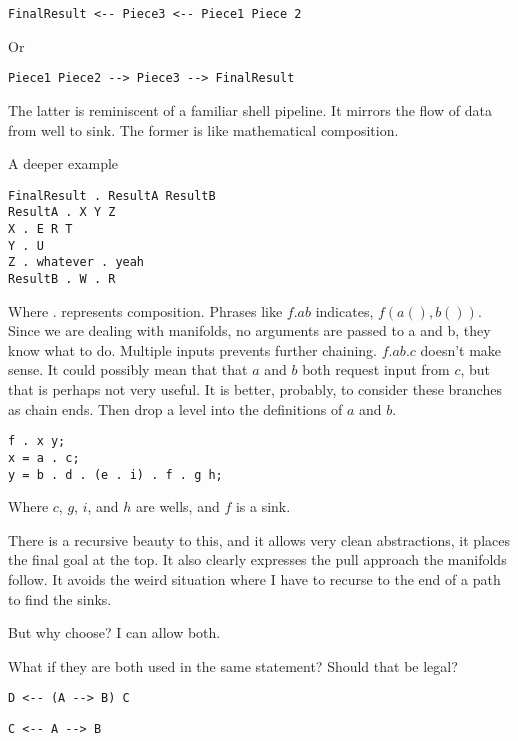 \documentclass[12pt]{article}
\begin{document}
\begin{verbatim}
FinalResult <-- Piece3 <-- Piece1 Piece 2
\end{verbatim}

Or

\begin{verbatim}
Piece1 Piece2 --> Piece3 --> FinalResult
\end{verbatim}

The latter is reminiscent of a familiar shell pipeline. It mirrors the flow of
data from well to sink. The former is like mathematical composition.

A deeper example

\begin{verbatim}
FinalResult . ResultA ResultB
ResultA . X Y Z
X . E R T
Y . U
Z . whatever . yeah
ResultB . W . R
\end{verbatim}

Where $.$ represents composition. Phrases like $f . a b$ indicates,
$f(a(),b())$. Since we are dealing with manifolds, no arguments are passed to
a and b, they know what to do. Multiple inputs prevents further chaining. $f . a b . c$ doesn't make sense. It could possibly mean that that $a$ and $b$
both request input from $c$, but that is perhaps not very useful. It is better,
probably, to consider these branches as chain ends. Then drop a level into the
definitions of $a$ and $b$.

\begin{verbatim}
f . x y;
x = a . c;
y = b . d . (e . i) . f . g h;
\end{verbatim}

Where $c$, $g$, $i$, and $h$ are wells, and $f$ is a sink.

There is a recursive beauty to this, and it allows very clean abstractions, it
places the final goal at the top. It also clearly expresses the pull approach
the manifolds follow. It avoids the weird situation where I have to recurse to
the end of a path to find the sinks.

But why choose? I can allow both.

What if they are both used in the same statement? Should that be legal?

\begin{verbatim}
D <-- (A --> B) C 
\end{verbatim}

\begin{verbatim}
C <-- A --> B
\end{verbatim}
\end{document}
